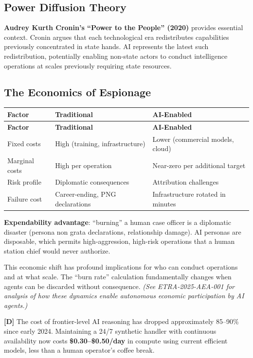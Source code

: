 \documentclass[11pt,letterpaper]{article}
\begin{document}
\subsection{Power Diffusion Theory}

\textbf{Audrey Kurth Cronin's ``Power to the People'' (2020)} provides essential context. Cronin argues that each technological era redistributes capabilities previously concentrated in state hands. AI represents the latest such redistribution, potentially enabling non-state actors to conduct intelligence operations at scales previously requiring state resources.

\subsection{The Economics of Espionage}

{\small
\begin{longtable}{L{3.5cm}L{4.5cm}L{4.5cm}}
\toprule
\textbf{Factor} & \textbf{Traditional} & \textbf{AI-Enabled} \\
\midrule
\endfirsthead
\toprule
\textbf{Factor} & \textbf{Traditional} & \textbf{AI-Enabled} \\
\midrule
\endhead
Fixed costs & High (training, infrastructure) & Lower (commercial models, cloud) \\*
Marginal costs & High per operation & Near-zero per additional target \\
Risk profile & Diplomatic consequences & Attribution challenges \\*
Failure cost & Career-ending, PNG declarations & Infrastructure rotated in minutes \\
\bottomrule
\end{longtable}}

\textbf{Expendability advantage}: ``burning'' a human case officer is a diplomatic disaster (persona non grata declarations, relationship damage). AI personas are disposable, which permits high-aggression, high-risk operations that a human station chief would never authorize.

This economic shift has profound implications for who can conduct operations and at what scale. The ``burn rate'' calculation fundamentally changes when agents can be discarded without consequence. \textit{(See ETRA-2025-AEA-001 for analysis of how these dynamics enable autonomous economic participation by AI agents.)}

\begin{keybox}
\textbf{[D]} The cost of frontier-level AI reasoning has dropped approximately 85--90\% since early 2024. Maintaining a 24/7 synthetic handler with continuous availability now costs \textbf{\$0.30--\$0.50/day} in compute using current efficient models, less than a human operator's coffee break.
\end{keybox}
\end{document}
